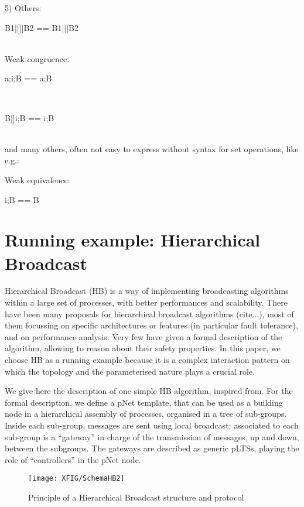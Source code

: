 \documentclass{lncs/llncs}
\begin{document}
5) Others:\\
\centerline{B1|[]|B2 == B1|||B2}\\


      
Weak congruence:\\
\centerline{a;i;B == a;B}\\
\centerline{B[]i;B == i;B}\\
and many others, often not easy to express without syntax for set operations,
like e.g.:
\centerline{}


Weak equivalence:\\
\centerline{i;B == B}

\newpage
  \section{Running example: Hierarchical Broadcast}

Hierarchical Broadcast (HB) is a way of implementing broadcasting
algorithms within a large set of processes, with better performances
and scalability. There have been many proposals for hierarchical
broadcast algorithms (cite...), most of them focussing on specific
architectures or features (in particular fault tolerance), and on
performance analysis. Very few have given a formal description of the
algorithm, allowing to reason about their safety properties.
In this paper, we choose HB as a running example because it is a
complex interaction pattern on which the topology and the
parameterised nature plays a crucial role.

We give here the description of one simple HB algorithm, inspired
from\cite{Taguchi03}. For the formal description, we define a
pNet template, that can be used as a building node in a hierarchical
assembly of processes, organised in a tree of sub-groups. Inside each
sub-group, messages are sent using  local broadcast; associated to
each sub-group is a ``gateway'' in charge of the
transmission of messages, up and down, between the subgroups. The
gateways are described as generic pLTSs, playing the role of
``controllers'' in the pNet node.

\begin{figure}[t]
\centerline{  \texttt{[image: XFIG/SchemaHB2]}}
  \caption{Principle of a Hierarchical Broadcast structure and protocol}
  \label{fig:hb-scenario}
\end{figure}
\end{document}
